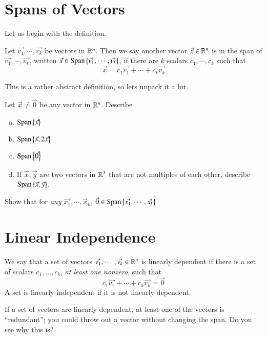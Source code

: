 \documentclass[Main.tex]{subfiles}
\begin{document}
\section{Spans of Vectors}

Let us begin with the definition.
\begin{Def}
  Let $\vec{v_1},\cdots,\vec{v_k}$ be vectors in $\mathbb{R}^n$.
  Then we say another vector $\vec{x}\in\mathbb{R}^n$ is in the span of $\vec{v_1},\cdots,\vec{v_k}$, written $\vec{x}\in\operatorname{Span}\nolimits\left\{\vec{v_1},\cdots,\vec{v_k}\right\}$, if there are $k$ scalars $c_1,\cdots, c_k$ such that 
  \[\vec{x} = c_1\vec{v_1}+\cdots+c_k\vec{v_k}\]
\end{Def}

This is a rather abstract definition, so lets unpack it a bit.
\begin{EasyEx}
  \label{sec:spanexp}
  Let $\vec{x}\ne \vec{0}$ be any vector in $\mathbb{R}^n$.  Describe
  \begin{enumerate}[a)]
  \item $\operatorname{Span}\nolimits\left\{\vec{x}\right\}$
  \item $\operatorname{Span}\nolimits\left\{\vec{x},2\vec{x}\right\}$
  \item $\operatorname{Span}\nolimits\left\{\vec{0}\right\}$
  \item If $\vec{x},\vec{y}$ are two vectors in $\mathbb{R}^3$ that are not multiples of each other, describe $\operatorname{Span}\nolimits\left\{\vec{x},\vec{y}\right\}$.  
  \end{enumerate}
\end{EasyEx}

\begin{EasyEx}
  Show that for \emph{any} $\vec{x_1},\cdots,\vec{x}_k$, $\vec{0}\in\operatorname{Span}\nolimits\left\{\vec{x_1},\cdots,\vec{x_k}\right\}$
\end{EasyEx}



\section{Linear Independence}

\begin{Def}
  We say that a set of vectors $\vec{v_1},\cdots,\vec{v_k}\in\mathbb{R}^n$ is linearly dependent if there is a set of scalars $c_1,...,c_k$, \emph{at least one nonzero}, such that
  \[c_1\vec{v_1}+\cdots+c_k\vec{v_k} = \vec{0}\]
  A set is linearly independent if it is not linearly dependent.  
\end{Def}

\begin{Remark}
  \label{sec:redundant}
  If a set of vectors are linearly dependent, at least one of the vectors is ``redundant''; you could throw out a vector without changing the span.  
  Do you see why this is?
\end{Remark}
\end{document}
